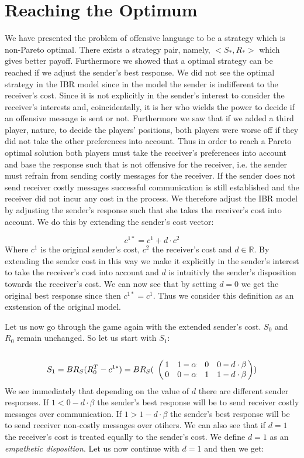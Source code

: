 \documentclass[10pt]{article}
\begin{document}
\section{Reaching the Optimum}
We have presented the problem of offensive language to be a strategy which is non-Pareto optimal. There exists a strategy pair, namely, $<S_*,R_*>$ which gives better payoff. Furthermore we showed that a optimal strategy can be reached if we adjust the sender's best response. We did not see the optimal strategy in the IBR model since in the model the sender is indifferent to the receiver's cost. Since it is not explicitly in the sender's interest to consider the receiver's interests and, coincidentally, it is her who wields the power to decide if an offensive message is sent or not. Furthermore we saw that if we added a third player, nature, to decide the players' positions, both players were worse off if they did not take the other preferences into account. Thus in order to reach a Pareto optimal solution both players must take the receiver's preferences into account and base the response such that is not offensive for the receiver, i.e. the sender must refrain from sending costly messages for the receiver. If the sender does not send receiver costly messages successful communication is still established and the receiver did not incur any cost in the process. We therefore adjust the IBR model by adjusting the sender's response such that she takes the receiver's cost into account. We do this by extending the sender's cost vector:

$$c^{1*}=c^{1} + d \cdot c^{2}$$
Where $c^{1}$ is the original sender's cost, $c^{2}$ the receiver's cost and $d \in \mathbb{R}$. By extending the sender cost in this way we make it explicitly in the sender's interest to take the receiver's cost into account and $d$ is intuitivly the sender's disposition towards the receiver's cost. We can now see that by setting $d=0$ we get the original best response since then $c^{1*}=c^{1}$. Thus we consider this definition as an exstension of the original model.

Let us now go through the game again with the extended sender's cost. $S_0$ and $R_0$ remain unchanged. So let us start with $S_1$:
\begin{equation*}
S_1= BR_S(R_0^T-c^{1*})=BR_S(
\bordermatrix{
                & & & &    \cr
     &       1 &         1-\alpha & 0       & 0-d\cdot \beta \cr
     &       0 &         0-\alpha & 1      & 1-d\cdot \beta
 }
)
\end{equation*}
We see immediately that depending on the value of $d$ there are different sender responses. If $1<0-d\cdot \beta$ the sender's best response will be to send receiver costly messages over communication.  If $1>1-d\cdot \beta$ the sender's best response will be to send receiver non-costly messages over otihers. We can also see that if $d=1$ the receiver's cost is treated equally to the sender's cost. We define $d=1$ as an \textit{empathetic disposition}. Let us now continue with $d=1$ and then we get:
\end{document}
